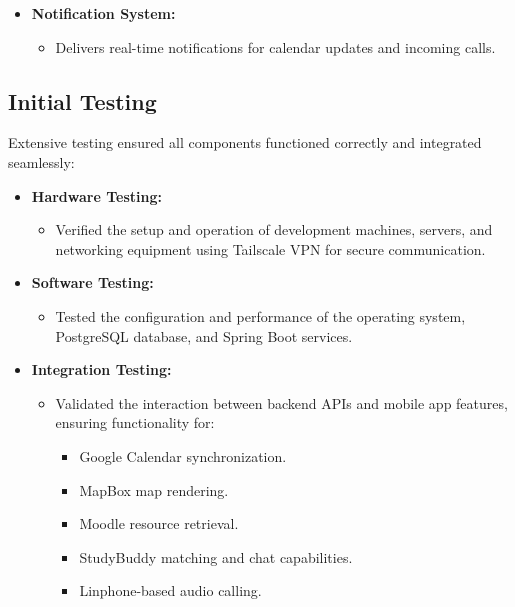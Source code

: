 \documentclass[12pt]{article}
\begin{document}
\begin{itemize}
    \item \textbf{Notification System:}  
    \begin{itemize}  
        \item Delivers real-time notifications for calendar updates and incoming calls.  
    \end{itemize}  
\end{itemize}

\pagebreak

\subsection{Initial Testing}  
Extensive testing ensured all components functioned correctly and integrated seamlessly:  

\begin{itemize}  
    \item \textbf{Hardware Testing:}  
    \begin{itemize}  
        \item Verified the setup and operation of development machines, servers, and networking equipment using Tailscale VPN for secure communication.  
    \end{itemize}  

    \item \textbf{Software Testing:}  
    \begin{itemize}  
        \item Tested the configuration and performance of the operating system, PostgreSQL database, and Spring Boot services.  
    \end{itemize}  

    \item \textbf{Integration Testing:}  
    \begin{itemize}  
        \item Validated the interaction between backend APIs and mobile app features, ensuring functionality for:  
        \begin{itemize}  
            \item Google Calendar synchronization.  
            \item MapBox map rendering.  
            \item Moodle resource retrieval.  
            \item StudyBuddy matching and chat capabilities.  
            \item Linphone-based audio calling.  
        \end{itemize}  
    \end{itemize}  
\end{itemize}
\end{document}
